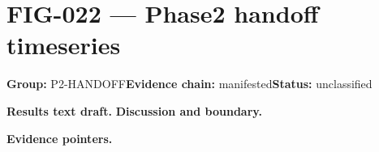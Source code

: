 \clearpage
\section{FIG-022 --- Phase2 handoff timeseries}
\label{figpage:fig-022}
\textbf{Group:} P2-HANDOFF\quad \textbf{Evidence chain:} manifested\quad \textbf{Status:} unclassified

\textbf{Results text draft.} 
\textbf{Discussion and boundary.} 


\textbf{Evidence pointers.}



\vfill
